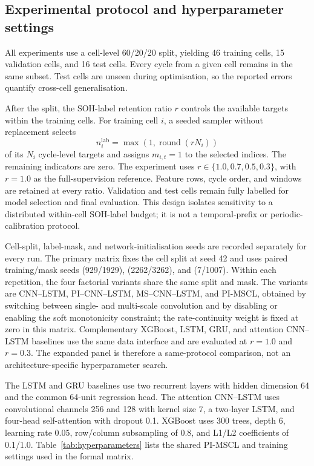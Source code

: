\documentclass[pdflatex,sn-mathphys-num]{sn-jnl}
\begin{document}
\subsection{Experimental protocol and hyperparameter settings}
\label{subsec:split_protocol}
\label{subsec:training_config}

All experiments use a cell-level 60/20/20 split, yielding 46 training cells, 15 validation cells, and 16 test cells. Every cycle from a given cell remains in the same subset. Test cells are unseen during optimisation, so the reported errors quantify cross-cell generalisation.

After the split, the SOH-label retention ratio $r$ controls the available targets within the training cells. For training cell $i$, a seeded sampler without replacement selects
\begin{equation}
  n_i^{\mathrm{lab}}=\max\left(1,\operatorname{round}(rN_i)\right)
\end{equation}
of its $N_i$ cycle-level targets and assigns $m_{i,t}=1$ to the selected indices. The remaining indicators are zero. The experiment uses $r\in\{1.0,0.7,0.5,0.3\}$, with $r=1.0$ as the full-supervision reference. Feature rows, cycle order, and windows are retained at every ratio. Validation and test cells remain fully labelled for model selection and final evaluation. This design isolates sensitivity to a distributed within-cell SOH-label budget; it is not a temporal-prefix or periodic-calibration protocol.

Cell-split, label-mask, and network-initialisation seeds are recorded separately for every run. The primary matrix fixes the cell split at seed 42 and uses paired training/mask seeds (929/1929), (2262/3262), and (7/1007). Within each repetition, the four factorial variants share the same split and mask. The variants are CNN--LSTM, PI--CNN--LSTM, MS--CNN--LSTM, and PI-MSCL, obtained by switching between single- and multi-scale convolution and by disabling or enabling the soft monotonicity constraint; the rate-continuity weight is fixed at zero in this matrix. Complementary XGBoost, LSTM, GRU, and attention CNN--LSTM baselines use the same data interface and are evaluated at $r=1.0$ and $r=0.3$. The expanded panel is therefore a same-protocol comparison, not an architecture-specific hyperparameter search.

The LSTM and GRU baselines use two recurrent layers with hidden dimension 64 and the common 64-unit regression head. The attention CNN--LSTM uses convolutional channels 256 and 128 with kernel size 7, a two-layer LSTM, and four-head self-attention with dropout 0.1. XGBoost uses 300 trees, depth 6, learning rate 0.05, row/column subsampling of 0.8, and L1/L2 coefficients of 0.1/1.0. Table~\ref{tab:hyperparameters} lists the shared PI-MSCL and training settings used in the formal matrix.
\end{document}
